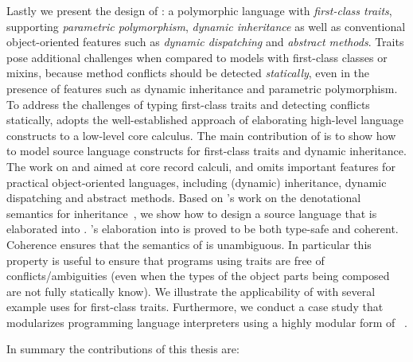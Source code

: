 Lastly we present the design of \sedel: a polymorphic language with
\emph{first-class traits}, supporting \emph{parametric polymorphism}, \emph{dynamic inheritance} as well as
conventional object-oriented features such as \emph{dynamic dispatching} and \emph{abstract
  methods}. Traits pose additional challenges when compared to models with
first-class classes or mixins, because method conflicts should be detected
\emph{statically}, even in the presence of features such as dynamic inheritance and
parametric polymorphism. To address the challenges of
typing first-class traits and detecting conflicts statically, \sedel adopts the
well-established approach of elaborating high-level language constructs to a
low-level core calculus. The main contribution of \sedel is to show how to model
source language constructs for first-class traits and dynamic inheritance. The
work on \namee and \fnamee aimed at core record calculi, and omits important
features for practical object-oriented languages, including (dynamic) inheritance, dynamic
dispatching and abstract methods. Based on \citeauthor{cook1989denotational}'s
work on the denotational semantics for inheritance~\citep{cook1989denotational},
we show how to design a source language that is elaborated into \fnamee.
\sedel's elaboration into \fnamee is proved to be both type-safe and coherent.
Coherence ensures that the semantics of \sedel is unambiguous. In particular
this property is useful to ensure that programs using traits are free of
conflicts/ambiguities (even when the types of the object parts being composed
are not fully statically know). We illustrate the applicability of \sedel with
several example uses for first-class traits. Furthermore, we conduct a case study
that modularizes programming language interpreters using a highly modular form
of \visitor~\citep{oliveira09modular, togersen:2004}.

In summary the contributions of this thesis are:

